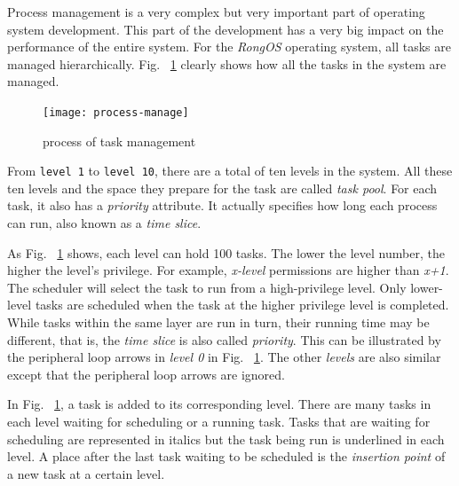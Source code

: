 \documentclass{swfcthesis}
\begin{document}
Process management is a very complex but very important part of operating system
development. This part of the development has a very big impact on the performance of the
entire system. For the \emph{RongOS} operating system, all tasks are managed
hierarchically. Fig. ~\ref{fig:proc-manage} clearly shows how all the tasks in the system
are managed.



\begin{figure}[!ht]
  \centering
  \texttt{[image: process-manage]}
  \caption{process of task management}
  \label{fig:proc-manage}
\end{figure}



From \texttt{level 1} to \texttt{level 10}, there are a total of ten levels in
the system. All these ten levels and the space they prepare for the task are called \emph{task
  pool}. For each task, it also has a \emph{priority} attribute. It actually specifies how
long each process can run, also known as a \emph{time slice}. 


As Fig. ~\ref{fig:proc-manage} shows, each level can hold 100 tasks. The lower the
level number, the higher the level's privilege. For example, \emph{x-level} permissions are
higher than \emph{x+1}. The scheduler will select the task to run from a high-privilege
level. Only lower-level tasks are scheduled when the task at the higher privilege level is
completed. While tasks within the same layer are run in turn, their running time may be
different, that is,  the \emph{time slice} is also called \emph{priority}. This can be
illustrated by the peripheral loop arrows in \emph{level 0} in
Fig. ~\ref{fig:proc-manage}. The other \emph{levels} are also similar except that the
peripheral loop arrows are ignored.



In Fig. ~\ref{fig:proc-manage}, a task is added to its corresponding
level. There are many tasks in each level waiting for scheduling or a running task. Tasks
that are waiting for scheduling are represented in italics but the task being run is
underlined in each level. A place after the last task waiting to be scheduled is the
\emph{insertion point} of a new task at a certain level.
\end{document}
